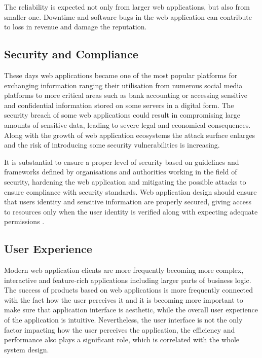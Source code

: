 The reliability is expected not only from larger web applications, but also from smaller one. Downtime and software bugs in the web application can contribute to loss in revenue and damage the reputation.

\subsection*{Security and Compliance}

These days web applications became one of the most popular platforms for exchanging information ranging their utilisation from numerous social media platforms to more critical areas such as bank accounting or accessing sensitive and confidential information stored on some servers in a digital form. The security breach of some web applications could result in compromising large amounts of sensitive data, leading to severe legal and economical consequences. Along with the growth of web application ecosystems the attack surface enlarges and the risk of introducing some security vulnerabilities is increasing.

It is substantial to ensure a proper level of security based on guidelines and frameworks defined by organisations and authorities working in the field of security, hardening the web application and mitigating the possible attacks to ensure compliance with security standards. Web application design should ensure that users identity and sensitive information are properly secured, giving access to resources only when the user identity is verified along with expecting adequate permissions \cite{ASurveyonWebApplicationSecurity}.

\subsection*{User Experience}

Modern web application clients are more frequently becoming more complex, interactive and feature-rich applications including larger parts of business logic. The success of products based on web applications is more frequently connected with the fact how the user perceives it and it is becoming more important to make sure that application interface is aesthetic, while the overall user experience of the application is intuitive. Nevertheless, the user interface is not the only factor impacting how the user perceives the application, the efficiency and performance also plays a significant role, which is correlated with the whole system design.

